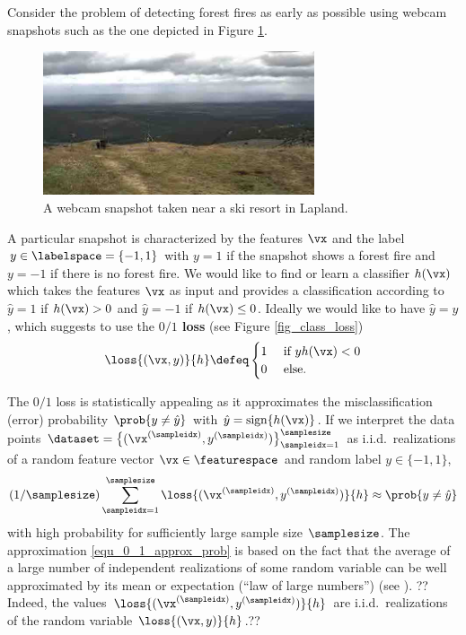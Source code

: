 \documentclass[12pt]{report}
\begin{document}
Consider the problem of detecting forest fires as early as possible using webcam snapshots such as the one 
depicted in Figure \ref{fig:webcam_forestfire}. 
\begin{figure}[htbp]
\begin{center}
\includegraphics[width=8cm]{WebcamLapland.jpg}  
\caption{A webcam snapshot taken near a ski resort in Lapland.}
\label{fig:webcam_forestfire}
\end{center}
\end{figure}
A particular snapshot is characterized by the features $\vx$ and the label $y \in \labelspace=\{-1,1\}$ 
with $y=1$ if the snapshot shows a forest fire and $y=-1$ if there is no forest fire. We would like to 
find or learn a classifier $h(\vx)$ which takes the features $\vx$ as input and provides a classification 
according to $\hat{y} = 1$ if $h(\vx) >0$ and $\hat{y}=-1$ if $h(\vx) \leq 0$. Ideally we would like to 
have $\hat{y} = y$, which suggests to use the {\bf $0/1$ loss} (see Figure \ref{fig_class_loss})
\begin{equation}
\label{equ_def_0_1}
\loss{(\vx,y)}{h} \defeq \begin{cases} 1 &\mbox{ if } y h(\vx) < 0 \\ 0 & \mbox{ else.} \end{cases}
\end{equation} 
 
The $0/1$ loss is statistically appealing as it approximates the misclassification 
(error) probability $\prob{ y \neq \hat{y} }$ with $\hat{y} = {\rm sign } \{ h(\vx) \}$. 
If we interpret the data points $\dataset = \big\{ (\vx^{(\sampleidx)},y^{(\sampleidx)}) \big\}_{\sampleidx=1}^{\samplesize}$ 
as i.i.d.\ realizations of a random feature vector $\vx \in \featurespace$ and random label $y \in \{-1,1\}$, 
\begin{equation} 
\label{equ_0_1_approx_prob}
(1/\samplesize) \sum_{\sampleidx=1}^{\samplesize} \loss{(\vx^{(\sampleidx)},y^{(\sampleidx)})}{h} \approx \prob{ y \neq \hat{y} }
\end{equation} 
with high probability for sufficiently large sample size $\samplesize$. The approximation \eqref{equ_0_1_approx_prob} 
is based on the fact that the average of a large number of independent realizations of some random variable 
can be well approximated by its mean or expectation (``law of large numbers'') (see \cite{BillingsleyProbMeasure}).  
?? Indeed, the values $\loss{(\vx^{(\sampleidx)},y^{(\sampleidx)})}{h}$ are i.i.d.\ realizations of the random variable 
$\loss{(\vx,y)}{h}$.??
\end{document}
